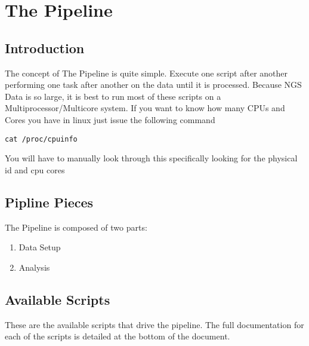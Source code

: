\documentclass{article}
\begin{document}
\section{The Pipeline}

\subsection{Introduction}
The concept of The Pipeline is quite simple. Execute one script after another performing one task after another on the data until it is processed. Because NGS Data is so large, it is best to run most of these scripts on a Multiprocessor/Multicore system.
If you want to know how many CPUs and Cores you have in linux just issue the following command
\begin{lstlisting}
cat /proc/cpuinfo
\end{lstlisting}
You will have to manually look through this specifically looking for the physical id and cpu cores

\subsection{Pipline Pieces}
The Pipeline is composed of two parts:
\begin{enumerate}
\item Data Setup
\item Analysis
\end{enumerate}

\subsection{Available Scripts}
These are the available scripts that drive the pipeline.
The full documentation for each of the scripts is detailed at the bottom of the document.
\end{document}

